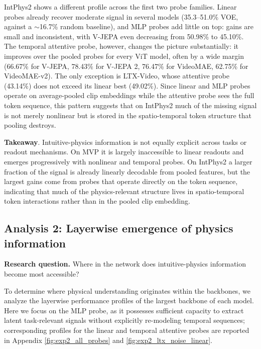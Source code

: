 IntPhys2 shows a different profile across the first two probe families. Linear
probes already recover moderate signal in several models (35.3--51.0\% VOE,
against a $\sim$16.7\% random baseline), and MLP probes add little on top:
gains are small and inconsistent, with V-JEPA even decreasing from 50.98\% to
45.10\%. The temporal attentive probe, however, changes the picture
substantially: it improves over the pooled probes for every ViT model, often by
a wide margin (66.67\% for V-JEPA, 78.43\% for V-JEPA 2, 76.47\% for VideoMAE,
62.75\% for VideoMAE-v2). The only exception is LTX-Video, whose attentive
probe (43.14\%) does not exceed its linear best (49.02\%). Since linear and MLP
probes operate on average-pooled clip embeddings while the attentive probe sees
the full token sequence, this pattern suggests that on IntPhys2 much of the
missing signal is not merely nonlinear but is stored in the spatio-temporal
token structure that pooling destroys.

\begin{takeawaybox}
\textbf{Takeaway}.
Intuitive-physics information is not equally explicit across tasks or readout
mechanisms. On MVP it is largely inaccessible to linear readouts and emerges
progressively with nonlinear and temporal probes. On IntPhys2 a larger fraction
of the signal is already linearly decodable from pooled features, but the
largest gains come from probes that operate directly on the token sequence,
indicating that much of the physics-relevant structure lives in spatio-temporal
token interactions rather than in the pooled clip embedding.
\end{takeawaybox}

\subsection*{Analysis 2: Layerwise emergence of physics information}
\label{sec:exp2}

\begin{researchquestionbox}
\textbf{Research question.}
Where in the network does intuitive-physics information become most accessible?
\end{researchquestionbox}

To determine where physical understanding originates within the backbones, we
analyze the layerwise performance profiles of the largest backbone of each
model. Here we focus on the MLP probe, as it possesses sufficient capacity to
extract latent task-relevant signals without explicitly re-modeling temporal
sequences; corresponding profiles for the linear and temporal attentive probes
are reported in Appendix \autoref{fig:exp2_all_probes} and
\autoref{fig:exp2_ltx_noise_linear}.

